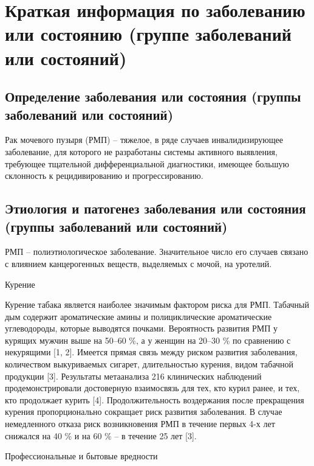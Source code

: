 \section{Краткая информация по заболеванию или состоянию (группе заболеваний или состояний)}
\label{sec:Intro}

\subsection{Определение заболевания или состояния (группы заболеваний или состояний)}
\label{sec:}
Рак мочевого пузыря (РМП) – тяжелое, в ряде случаев инвалидизирующее заболевание, для которого не разработаны системы активного выявления, требующее тщательной дифференциальной диагностики, имеющее большую склонность к рецидивированию и прогрессированию.

\subsection{Этиология и патогенез заболевания или состояния (группы заболеваний или состояний)}
\label{sec:}
РМП – полиэтиологическое заболевание. Значительное число его случаев связано с влиянием канцерогенных веществ, выделяемых с мочой, на уротелий.

Курение

Курение табака является наиболее значимым фактором риска для РМП. Табачный дым содержит ароматические амины и полициклические ароматические углеводороды, которые выводятся почками. Вероятность развития РМП у курящих мужчин выше на 50–60 \%, а у женщин на 20–30 \% по сравнению с некурящими [1, 2]. Имеется прямая связь между риском развития заболевания, количеством выкуриваемых сигарет, длительностью курения, видом табачной продукции [3]. Результаты метаанализа 216 клинических наблюдений продемонстрировали достоверную взаимосвязь для тех, кто курил ранее, и тех, кто продолжает курить [4]. Продолжительность воздержания после прекращения курения пропорционально сокращает риск развития заболевания. В случае немедленного отказа риск возникновения РМП в течение первых 4-х лет снижался на 40 \% и на 60 \% – в течение 25 лет [3].

Профессиональные и бытовые вредности

